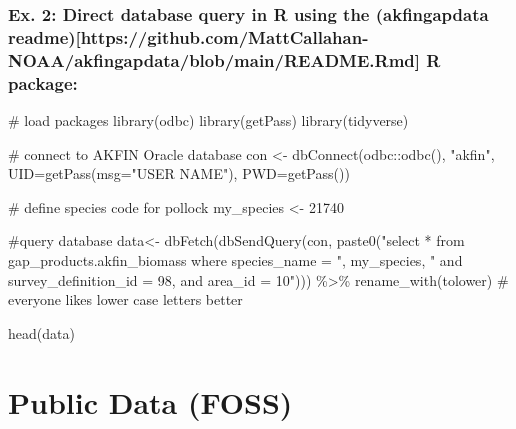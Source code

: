 \documentclass[
  letterpaper,
  oneside,
  open=any]{scrbook}
\newenvironment{Shaded}{\begin{snugshade}}{\end{snugshade}}
\newcommand{\AttributeTok}[1]{\textcolor[rgb]{0.40,0.45,0.13}{#1}}
\newcommand{\CommentTok}[1]{\textcolor[rgb]{0.37,0.37,0.37}{#1}}
\newcommand{\DecValTok}[1]{\textcolor[rgb]{0.68,0.00,0.00}{#1}}
\newcommand{\FunctionTok}[1]{\textcolor[rgb]{0.28,0.35,0.67}{#1}}
\newcommand{\NormalTok}[1]{\textcolor[rgb]{0.00,0.23,0.31}{#1}}
\newcommand{\OtherTok}[1]{\textcolor[rgb]{0.00,0.23,0.31}{#1}}
\newcommand{\SpecialCharTok}[1]{\textcolor[rgb]{0.37,0.37,0.37}{#1}}
\newcommand{\StringTok}[1]{\textcolor[rgb]{0.13,0.47,0.30}{#1}}
\begin{document}
\hypertarget{ex.-2-direct-database-query-in-r-using-the-akfingapdata-readmehttpsgithub.commattcallahan-noaaakfingapdatablobmainreadme.rmd-r-package}{%
\section{Ex. 2: Direct database query in R using the (akfingapdata
readme){[}https://github.com/MattCallahan-NOAA/akfingapdata/blob/main/README.Rmd{]}
R
package:}\label{ex.-2-direct-database-query-in-r-using-the-akfingapdata-readmehttpsgithub.commattcallahan-noaaakfingapdatablobmainreadme.rmd-r-package}}

\begin{Shaded}
\begin{Highlighting}[]
\CommentTok{\# load packages}
\FunctionTok{library}\NormalTok{(odbc)}
\FunctionTok{library}\NormalTok{(getPass)}
\FunctionTok{library}\NormalTok{(tidyverse)}

\CommentTok{\# connect to AKFIN Oracle database}
\NormalTok{con }\OtherTok{\textless{}{-}} \FunctionTok{dbConnect}\NormalTok{(odbc}\SpecialCharTok{::}\FunctionTok{odbc}\NormalTok{(), }\StringTok{"akfin"}\NormalTok{, }\AttributeTok{UID=}\FunctionTok{getPass}\NormalTok{(}\AttributeTok{msg=}\StringTok{"USER NAME"}\NormalTok{), }\AttributeTok{PWD=}\FunctionTok{getPass}\NormalTok{())}
\end{Highlighting}
\end{Shaded}

\begin{Shaded}
\begin{Highlighting}[]
\CommentTok{\# define species code for pollock}
\NormalTok{my\_species }\OtherTok{\textless{}{-}} \DecValTok{21740}

\CommentTok{\#query database}
\NormalTok{data}\OtherTok{\textless{}{-}} \FunctionTok{dbFetch}\NormalTok{(}\FunctionTok{dbSendQuery}\NormalTok{(con,}
                           \FunctionTok{paste0}\NormalTok{(}\StringTok{"select * from gap\_products.akfin\_biomass }
\StringTok{where species\_name = "}\NormalTok{, my\_species, }
\StringTok{" and survey\_definition\_id = 98, }
\StringTok{and area\_id = 10"}\NormalTok{))) }\SpecialCharTok{\%\textgreater{}\%}
\FunctionTok{rename\_with}\NormalTok{(tolower) }\CommentTok{\# everyone likes lower case letters better}

\FunctionTok{head}\NormalTok{(data)}
\end{Highlighting}
\end{Shaded}

\part{Public Data (FOSS)}
\end{document}

